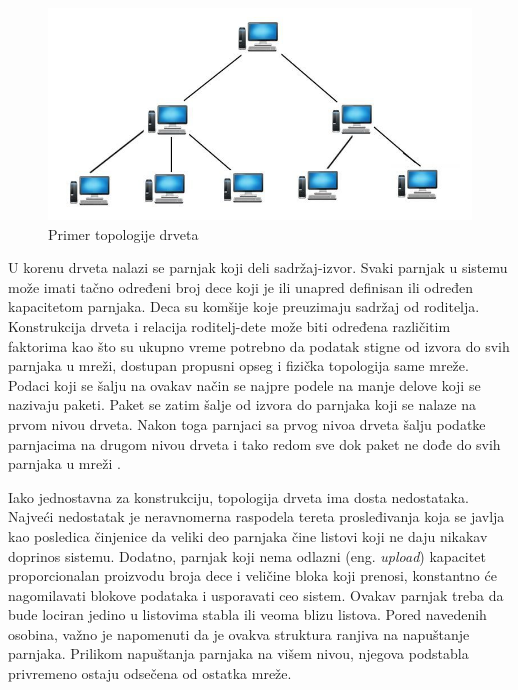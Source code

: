 \documentclass[12pt,oneside]{memoir}
\begin{document}
\begin{figure}[!ht]
  \centering
  \includegraphics[width=1.05\textwidth]{slike/tree-topology.jpg}
  \caption{Primer topologije drveta}
  \label{fig:topologija-drveta}
\end{figure}
\par

U korenu drveta nalazi se parnjak koji deli sadržaj-izvor. Svaki parnjak u sistemu može imati tačno određeni broj dece koji je ili unapred definisan ili određen kapacitetom parnjaka. Deca su komšije koje preuzimaju sadržaj od roditelja. Konstrukcija drveta i relacija roditelj-dete može biti određena različitim faktorima kao što su ukupno vreme potrebno da podatak stigne od izvora do svih parnjaka u mreži, dostupan propusni opseg i fizička topologija same mreže. Podaci koji se šalju na ovakav način se najpre podele na manje delove koji se nazivaju paketi. Paket se zatim šalje od izvora do parnjaka koji se nalaze na prvom nivou drveta. Nakon toga parnjaci sa prvog nivoa drveta šalju podatke parnjacima na drugom nivou drveta i tako redom sve dok paket ne dođe do svih parnjaka u mreži \cite{DeBoever07}.

Iako jednostavna za konstrukciju, topologija drveta ima dosta nedostataka. Najveći nedostatak je neravnomerna raspodela tereta prosleđivanja koja se javlja kao posledica činjenice da veliki deo parnjaka čine listovi koji ne daju nikakav doprinos sistemu. Dodatno, parnjak koji nema odlazni (eng. \textit{upload}) kapacitet proporcionalan proizvodu broja dece i veličine bloka koji prenosi, konstantno će nagomilavati blokove podataka i usporavati ceo sistem. Ovakav parnjak treba da bude lociran jedino u listovima stabla ili veoma blizu listova. 
Pored navedenih osobina, važno je napomenuti da je ovakva struktura ranjiva na napuštanje parnjaka. Prilikom napuštanja parnjaka na višem nivou, njegova podstabla privremeno ostaju odsečena od ostatka mreže.
\end{document}
